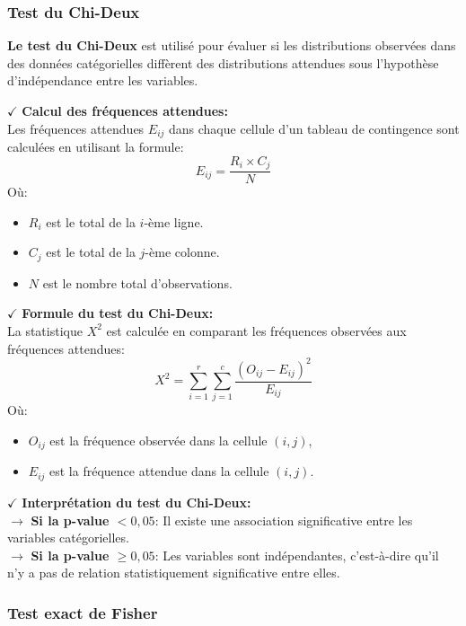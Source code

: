\subsubsection{Test du Chi-Deux}

\textbf{Le test du Chi-Deux} est utilisé pour évaluer si les distributions observées dans des données catégorielles diffèrent des distributions attendues sous l'hypothèse d'indépendance entre les variables.

\textbf{\(\checkmark\)} \textbf{Calcul des fréquences attendues:}\\
Les fréquences attendues \( E_{ij} \) dans chaque cellule d'un tableau de contingence sont calculées en utilisant la formule:
\[
E_{ij} = \frac{R_i \times C_j}{N}
\]
Où:
\begin{itemize}
    \item \( R_i \) est le total de la \( i \)-ème ligne.
    \item \( C_j \) est le total de la \( j \)-ème colonne.
    \item \( N \) est le nombre total d'observations.
\end{itemize}

\textbf{\(\checkmark\)} \textbf{Formule du test du Chi-Deux:}\\
La statistique \( X^2 \) est calculée en comparant les fréquences observées aux fréquences attendues:
\[
X^2 = \sum_{i=1}^{r} \sum_{j=1}^{c} \frac{(O_{ij} - E_{ij})^2}{E_{ij}}
\]
Où:
\begin{itemize}
    \item \( O_{ij} \) est la fréquence observée dans la cellule \( (i, j) \),
    \item \( E_{ij} \) est la fréquence attendue dans la cellule \( (i, j) \).
\end{itemize}

\textbf{\(\checkmark\)} \textbf{Interprétation du test du Chi-Deux:}\\
    \textbf{\(\rightarrow\)} \textbf{Si la p-value \( < 0{,}05 \)}: Il existe une association significative entre les variables catégorielles.\\
    \textbf{\(\rightarrow\)} \textbf{Si la p-value \( \geq 0{,}05 \)}: Les variables sont indépendantes, c'est-à-dire qu'il n'y a pas de relation statistiquement significative entre elles.

\subsubsection{Test exact de Fisher}

